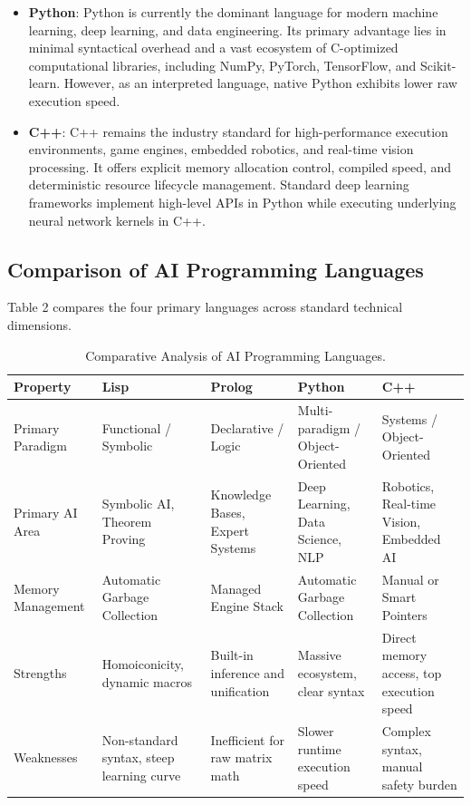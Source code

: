 \documentclass[12pt]{report}
\begin{document}
\begin{itemize}
    \item \textbf{Python}: Python is currently the dominant language for modern machine learning, deep learning, and data engineering. Its primary advantage lies in minimal syntactical overhead and a vast ecosystem of C-optimized computational libraries, including NumPy, PyTorch, TensorFlow, and Scikit-learn. However, as an interpreted language, native Python exhibits lower raw execution speed.
    \item \textbf{C++}: C++ remains the industry standard for high-performance execution environments, game engines, embedded robotics, and real-time vision processing. It offers explicit memory allocation control, compiled speed, and deterministic resource lifecycle management. Standard deep learning frameworks implement high-level APIs in Python while executing underlying neural network kernels in C++.
\end{itemize}

\subsection{Comparison of AI Programming Languages}

Table 2 compares the four primary languages across standard technical dimensions.

\begin{table}[h]
\centering
\begin{tabularx}{\textwidth}{@{} >{\raggedright\arraybackslash}p{2.2cm} X X X X @{}}
\toprule
\textbf{Property} & \textbf{Lisp} & \textbf{Prolog} & \textbf{Python} & \textbf{C++} \\
\midrule
Primary Paradigm & Functional / Symbolic & Declarative / Logic & Multi-paradigm / Object-Oriented & Systems / Object-Oriented \\
Primary AI Area & Symbolic AI, Theorem Proving & Knowledge Bases, Expert Systems & Deep Learning, Data Science, NLP & Robotics, Real-time Vision, Embedded AI \\
Memory Management & Automatic Garbage Collection & Managed Engine Stack & Automatic Garbage Collection & Manual or Smart Pointers \\
Strengths & Homoiconicity, dynamic macros & Built-in inference and unification & Massive ecosystem, clear syntax & Direct memory access, top execution speed \\
Weaknesses & Non-standard syntax, steep learning curve & Inefficient for raw matrix math & Slower runtime execution speed & Complex syntax, manual safety burden \\
\bottomrule
\end{tabularx}
\caption{Comparative Analysis of AI Programming Languages.}
\end{table}
\end{document}
